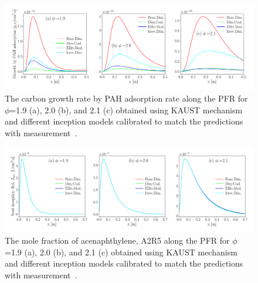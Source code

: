\begin{figure}[H]
	\centering
	\includegraphics[width=1\textwidth]{Figures/Results/PSR/PAH_rate_eq_ratio_all_single_mech.pdf}
	\caption{The carbon growth rate by PAH adsorption rate along the PFR for $\phi$=1.9 (a), 2.0 (b), and 2.1 (c) obtained using KAUST mechanism and different inception models calibrated to match the predictions with measurement~\citep{manzello2007soot}.}
	\label{fig:psrpfr_PAHads} 
\end{figure}

\begin{figure}[H]
	\centering
	\includegraphics[width=1\textwidth]{Figures/Results/PSR/A2R5_eq_ratio_all_single_mech.pdf}
	\caption{The mole fraction of acenaphthylene, A2R5 along the PFR for $\phi$=1.9 (a), 2.0 (b), and 2.1 (c) obtained using KAUST mechanism and different inception models calibrated to match the predictions with measurement~\citep{manzello2007soot}.}
	\label{fig:psrpfr_A2R5} 
\end{figure}